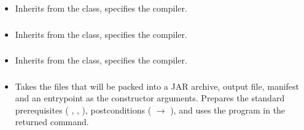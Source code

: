 \begin{itemize}[label={}]
    \item Inherits from the \hyperref[subsec:CompileBase]{} class, specifies the 
          compiler.
\end{itemize}

\subsubsection*{}\label{subsec:CompileHaskell}

\begin{itemize}[label={}]
    \item Inherits from the \hyperref[subsec:CompileBase]{} class, specifies the 
          compiler.
\end{itemize}

\subsubsection*{}\label{subsec:CompileJava}

\begin{itemize}[label={}]
    \item Inherits from the \hyperref[subsec:CompileBase]{} class, specifies the 
          compiler.
\end{itemize}

\subsubsection*{}\label{subsec:CreateJar}

\begin{itemize}[label={}]
    \item Takes the files that will be packed into a JAR archive, output file, manifest and an entrypoint as the
          constructor arguments.
          Prepares the standard prerequisites (
          \hyperref[subsec:ProgramExistsPrerequisite]{},
          \hyperref[subsec:FileExistsPrerequisite]{},
          \hyperref[subsec:NonEmptyListPrerequisite]{}
          ), postconditions (
          \hyperref[subsec:ExitCodePostcondition]{} $\rightarrow$ 
          ), and uses the  program in the returned command.
\end{itemize}

